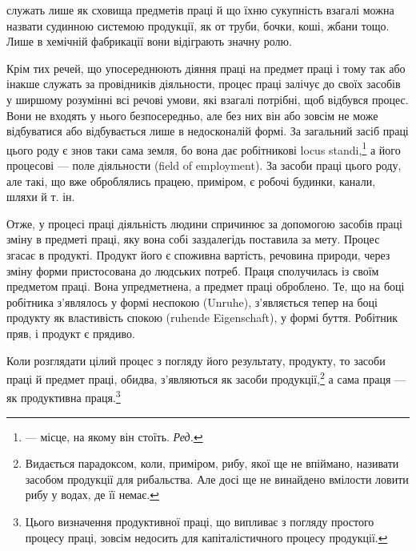\parcont{}  %
служать лише як сховища предметів праці й що їхню сукупність
взагалі можна назвати судинною системою продукції, як от
труби, бочки, коші, жбани тощо. Лише в хемічній фабрикації
вони відіграють значну ролю.

Крім тих речей, що упосереднюють діяння праці на предмет
праці і тому так або інакше служать за провідників діяльности,
процес праці залічує до своїх засобів у ширшому розумінні всі
речові умови, які взагалі потрібні, щоб відбувся процес. Вони
не входять у нього безпосередньо, але без них він або зовсім
не може відбуватися або відбувається лише в недосконалій формі.
За загальний засіб праці цього роду є знов таки сама земля, бо
вона дає робітникові locus standi,\footnote*{
— місце, на якому він стоїть. \emph{Ред.}
} а його процесові — поле
діяльности (field of employment). За засоби праці цього роду,
але такі, що вже оброблялись працею, приміром, є робочі будинки,
канали, шляхи й т. ін.

Отже, у процесі праці діяльність людини спричинює за допомогою
засобів праці зміну в предметі праці, яку вона собі заздалегідь
поставила за мету. Процес згасає в продукті. Продукт його є
споживна вартість, речовина природи, через зміну форми пристосована
до людських потреб. Праця сполучилась із своїм предметом
праці. Вона упредметнена, а предмет праці оброблено. Те, що
на боці робітника з’являлось у формі неспокою (Unruhe), з’являється
тепер на боці продукту як властивість спокою (ruhende
Eigenschaft), у формі буття. Робітник пряв, і продукт є прядиво.

Коли розглядати цілий процес з погляду його результату,
продукту, то засоби праці й предмет праці, обидва, з’являються
як засоби продукції,\footnote{
Видається парадоксом, коли, приміром, рибу, якої ще не впіймано,
називати засобом продукції для рибальства. Але досі ще не винайдено
вмілости ловити рибу у водах, де її немає.
} а сама праця — як продуктивна праця.\footnote{
Цього визначення продуктивної праці, що випливає з погляду простого
процесу праці, зовсім недосить для капіталістичного процесу продукції.
}

